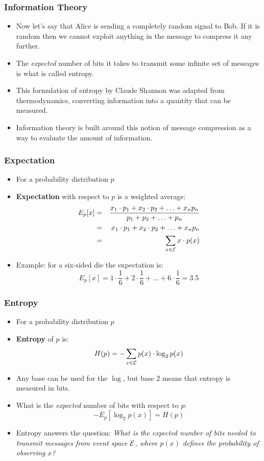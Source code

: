 \documentclass[handout]{beamer}
\begin{document}
\begin{frame}
\frametitle{Information Theory}
\begin{itemize}[<+->]
\item Now let's say that Alice is sending a completely random signal to
  Bob. If it is random then we cannot exploit anything in the message
  to compress it any further.
\item The {\em expected} number of bits it takes to transmit
  some infinite set of messages is what is called entropy. 
\item This formulation of entropy by Claude Shannon was adapted from
  thermodynamics, converting information into a quantity that can be measured.
\item Information theory is built around this notion of message
  compression as a way to evaluate the amount of information. 
\end{itemize}

\end{frame}

\begin{frame}[fragile]
\frametitle{Expectation}
\begin{itemize}[<+->]
\item For a probability distribution $p$
\item \textbf{Expectation} with respect to $p$ is a weighted average:
\begin{eqnarray*}
 E_p[x] &=& \frac{x_1 \cdot p_1 + x_2 \cdot p_2 + \ldots + x_n p_n}{p_1 + p_2 + \ldots + p_n} \\
  &=& x_1 \cdot p_1 + x_2 \cdot p_2 + \ldots + x_n p_n \\
  &=& \sum_{x \in {\cal E}} x \cdot p(x) 
\end{eqnarray*}
\item Example: for a six-sided die the expectation is:
\[ E_p[x] = 1 \cdot \frac{1}{6} + 2 \cdot \frac{1}{6} + \ldots + 6 \cdot \frac{1}{6} = 3.5 \]
\end{itemize}

\end{frame}

\begin{frame}
\frametitle{Entropy}
\begin{itemize}[<+->]
\item For a probability distribution $p$
\item \textbf{Entropy} of $p$ is: 
\[ H(p) = - \sum_{x \in {\cal E}} p(x) \cdot \log_2 p(x) \]
\item Any base can be used for the $\log$, but base $2$ means
  that entropy is measured in bits.
\item What is the {\it expected} number of bits with respect to $p$:
\[ - E_p [ \log_2 p(x) ] = H(p) \]
\item Entropy answers the question: {\it What is the expected
  number of bits needed to transmit messages from event 
  space ${\cal E}$, where $p(x)$ defines the probability of observing $x$?} 
\end{itemize}

\end{frame}
\end{document}
